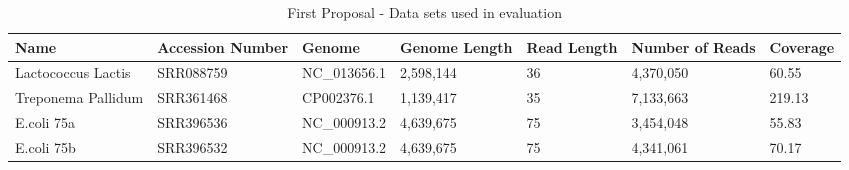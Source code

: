 \documentclass[12pt]{llncs}
\newcommand{\TBstrut}{{\rule{0pt}{7ex}}{\rule[2ex]{0pt}{0pt}}} %
\begin{document}
\begin{longtable}{|m{22mm}|m{21mm}|m{23mm}|m{16.5mm}|m{12mm}|m{17mm}|m{16mm}|}
	    \caption{\label{tab:eval1-data}First Proposal - Data sets used in evaluation} \\
        \hline
        Name & Accession Number & Genome & Genome Length & Read Length & Number of Reads & Coverage\TBstrut\\ %
        \hline
        Lactococcus Lactis & SRR088759 & NC\_013656.1 & 2,598,144 & 36 & 4,370,050 & 60.55\TBstrut\\ %
        \hline
        Treponema Pallidum & SRR361468 & CP002376.1 & 1,139,417 & 35 & 7,133,663 & 219.13\TBstrut\\ %
        \hline
        E.coli 75a & SRR396536 & NC\_000913.2 & 4,639,675 & 75 & 3,454,048 & 55.83\TBstrut\\ %
        \hline
        E.coli 75b & SRR396532 & NC\_000913.2 & 4,639,675 & 75 & 4,341,061 & 70.17\TBstrut\\ %
        \hline
\end{longtable}
\end{document}
